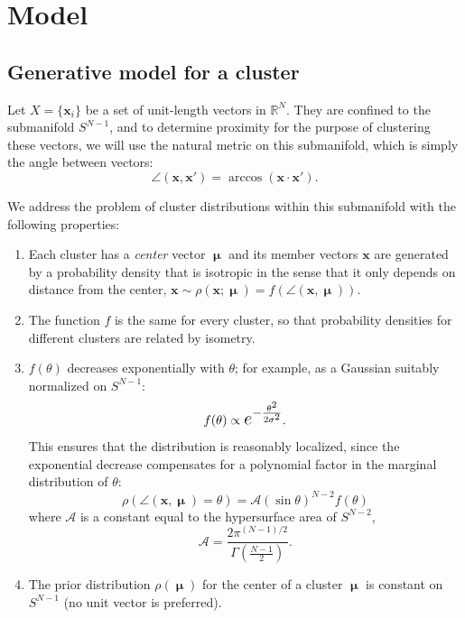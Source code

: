\documentclass{article}
\begin{document}
\section{Model}
\label{sec:model}

\subsection{Generative model for a cluster}
\label{sec:generative}

Let $X=\{\mathbf{x}_i\}$ be a set of unit-length vectors in $\mathbb{R}^{N}$. They are confined to the submanifold $S^{N-1}$, and to determine proximity for the purpose of clustering these vectors, we will use the natural metric on this submanifold, which is simply the angle between vectors:
\begin{equation}
\angle(\mathbf{x},\mathbf{x'}) = \arccos(\mathbf{x}\cdot\mathbf{x'}).
\end{equation}

We address the problem of cluster distributions within this submanifold with the following properties:
\begin{enumerate}
  \item Each cluster has a \textit{center} vector $\bm{\upmu}$ and its member vectors $\mathbf{x}$ are generated by a probability density that is isotropic in the sense that it only depends on distance from the center, $\mathbf{x}\sim\rho(\mathbf{x};\bm{\upmu})=f\left(\angle(\mathbf{x},\bm{\upmu})\right)$.
  \item The  function $f$ is the same for every cluster, so that probability densities for different clusters are related by isometry.
  \item $f(\theta)$ decreases exponentially with $\theta$; for example, as a Gaussian suitably normalized on $S^{N-1}$:
  \begin{equation}
  f(\theta)\propto \mbox{\Large$e^{-\frac{\theta^2}{2\sigma^2}}$}.
  \end{equation}
  This ensures that the distribution is reasonably localized, since the exponential decrease compensates for a polynomial factor in the marginal distribution of $\theta$:
  \begin{equation}
  \rho(\angle(\mathbf{x},\bm{\upmu})=\theta)=\mathcal{A}(\sin\theta)^{N-2}f(\theta)
  \end{equation}
  where $\mathcal{A}$ is a constant equal to the hypersurface area of $S^{N-2}$,
  \begin{equation}
  \mathcal{A}=\frac{2\pi^{(N-1)/2}}{\Gamma\left(\frac{N-1}{2}\right)}.
  \end{equation}
  \item The prior distribution $\rho(\bm{\upmu})$ for the center of a cluster $\bm{\upmu}$ is constant on $S^{N-1}$ (no unit vector is preferred).
\end{enumerate}
\end{document}
